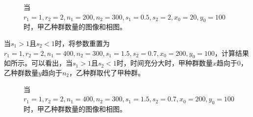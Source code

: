 \documentclass[12pt,a4paper]{article}
\begin{document}
\begin{figure}[t]
    \centering
    \caption{当$r_1=1,r_2=2,n_1=200,n_2=300,s_1=0.5,s_2=2,x_0=20,y_0=100$时，甲乙种群数量的图像和相图。}
    \label{fig:ex9_sub2_bigx}
\end{figure}

当$s_1 > 1$且$s_2 < 1$时，将参数重置为$r_1=1,r_2=2,n_1=400,n_2=300,s_1=1.5,s_2=0.7,x_0=200,y_0=100$，计算结果如所示。可以看出，当$s_1 > 1$且$s_2 < 1$时，时间充分大时，甲种群数量$x$趋向于0，乙种群数量$y$趋向于$n_2$，乙种群取代了甲种群。

\begin{figure}[t]
    \centering
    \caption{当$r_1=1,r_2=2,n_1=400,n_2=300,s_1=1.5,s_2=0.7,x_0=200,y_0=100$时，甲乙种群数量的图像和相图。}
    \label{fig:ex9_sub2_bigy}
\end{figure}
\end{document}

